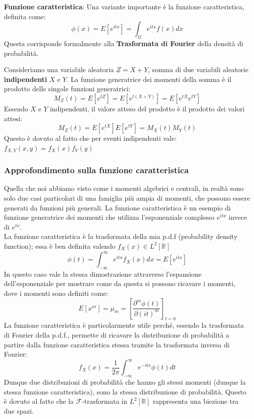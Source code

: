 \documentclass[openany,a4paper,12pt]{book}
\theoremstyle{remark}
\begin{document}
\begin{definizione}
    \textbf{Funzione caratteristica}:
    Una variante importante è la funzione caratteristica, definita come:
    \[
    \phi (x) = E[e^{itx}] = \int_\Omega e^{itx}f(x) dx
    \]
    Questa corrisponde formalmente alla \textbf{Trasformata di Fourier} della densità di probabilità.
\end{definizione}
Consideriamo una variabile aleatoria $Z = X + Y$, somma di due variabili aleatorie \textbf{indipendenti} $X$ e $Y$.
La funzione generatrice dei momenti della somma è il prodotto delle singole funzioni generatrici:
\[
M_Z(t) = E[e^{tZ}] = E[e^{t(X+Y)}] = E[e^{tX}e^{tY}]
\]
Essendo $X$ e $Y$ indipendenti, il valore atteso del prodotto è il prodotto dei valori attesi:
\[
M_Z(t) = E[e^{tX}]E[e^{tY}] = M_X(t)M_Y(t)
\]
Questo è dovuto al fatto che per eventi indipendenti vale: $f_{X,Y}(x,y)=f_X(x) f_Y(y)$

\subsubsection*{Approfondimento sulla funzione caratteristica}
Quella che noi abbiamo visto come i momenti algebrici e centrali, in realtà sono solo due casi particolari di una famiglia più ampia di momenti, 
che possono essere generati da funzioni più generali. La funzione caratteristica è un esempio di funzione generatrice dei momenti che utilizza l'esponenziale complesso $e^{itx}$ invece di $e^{tx}$.\\
La funzione caratteristica è la trasformata della mia p.d.f (probability density function); essa è ben definita valendo $f_X(x) \in L^2[\mathbb{R}]$
\[
\phi(t) = \int_{-\infty}^{\infty} e^{itx} f_X(x) dx = E[e^{itx}]
\]
In questo caso vale la stessa dimostrazione attraverso l'espansione dell'esponenziale per mostrare come da questa si possono ricavare i momenti, dove i momenti sono definiti come:
\[
E[x^m]= \mu_m = \left[ \frac{\partial ^m \phi(t)}{\partial {(it)}^m}\right]_{t=0}
\]
La funzione caratteristica è particolarmente utile perché, essendo la trasformata di Fourier della p.d.f., permette di ricavare la distribuzione di probabilità a partire dalla funzione caratteristica stessa tramite la trasformata inversa di Fourier:
\[
f_X(x) = \frac{1}{2\pi} \int_{-\infty}^{\infty} e^{-itx} \phi(t) dt
\]
Dunque due distribuzioni di probabilità che hanno gli stessi momenti (dunque la stessa funzione caratteristica), sono la stessa distribuzione di probabilità. 
Questo è dovuto al fatto che la $\mathcal{F}$-trasformata in $L^2[\mathbb{R}]$ rappresenta una biezione tra due spazi.
\end{document}
